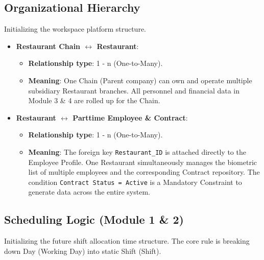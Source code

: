 \subsection{Organizational Hierarchy}
Initializing the workspace platform structure.

\begin{itemize}
    \item \textbf{Restaurant Chain $\leftrightarrow$ Restaurant}:
    \begin{itemize}
        \item \textbf{Relationship type}: 1 - n (One-to-Many).
        \item \textbf{Meaning}: One Chain (Parent company) can own and operate multiple subsidiary Restaurant branches. All personnel and financial data in Module 3 \& 4 are rolled up for the Chain.
    \end{itemize}
    
    \item \textbf{Restaurant $\leftrightarrow$ Parttime Employee \& Contract}:
    \begin{itemize}
        \item \textbf{Relationship type}: 1 - n (One-to-Many).
        \item \textbf{Meaning}: The foreign key \texttt{Restaurant\_ID} is attached directly to the Employee Profile. One Restaurant simultaneously manages the biometric list of multiple employees and the corresponding Contract repository. The condition \texttt{Contract Status = Active} is a Mandatory Constraint to generate data across the entire system.
    \end{itemize}
\end{itemize}

\subsection{Scheduling Logic (Module 1 \& 2)}
Initializing the future shift allocation time structure. The core rule is breaking down Day (Working Day) into static Shift (Shift).


